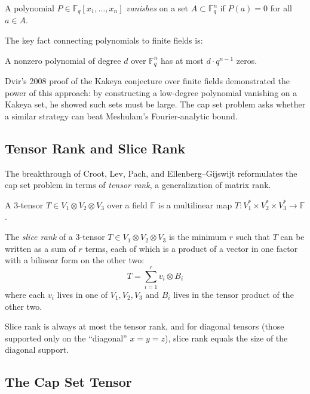 \begin{definition}
A polynomial $P \in \mathbb{F}_q[x_1, \ldots, x_n]$ \emph{vanishes} on a set $A \subset \mathbb{F}_q^n$ if $P(a) = 0$ for all $a \in A$.
\end{definition}

The key fact connecting polynomials to finite fields is:

\begin{fact}
A nonzero polynomial of degree $d$ over $\mathbb{F}_q^n$ has at most $d \cdot q^{n-1}$ zeros.
\end{fact}

Dvir's 2008 proof of the Kakeya conjecture over finite fields demonstrated the power of this approach: by constructing a low-degree polynomial vanishing on a Kakeya set, he showed such sets must be large. The cap set problem asks whether a similar strategy can beat Meshulam's Fourier-analytic bound.

\subsection{Tensor Rank and Slice Rank}

The breakthrough of Croot, Lev, Pach, and Ellenberg--Gijswijt reformulates the cap set problem in terms of \emph{tensor rank}, a generalization of matrix rank.

\begin{definition}[Tensor]
A 3-tensor $T \in V_1 \otimes V_2 \otimes V_3$ over a field $\mathbb{F}$ is a multilinear map $T: V_1^* \times V_2^* \times V_3^* \to \mathbb{F}$.
\end{definition}

\begin{definition}
The \emph{slice rank} of a 3-tensor $T \in V_1 \otimes V_2 \otimes V_3$ is the minimum $r$ such that $T$ can be written as a sum of $r$ terms, each of which is a product of a vector in one factor with a bilinear form on the other two:
\[
T = \sum_{i=1}^{r} v_i \otimes B_i
\]
where each $v_i$ lives in one of $V_1, V_2, V_3$ and $B_i$ lives in the tensor product of the other two.
\end{definition}

Slice rank is always at most the tensor rank, and for diagonal tensors (those supported only on the ``diagonal'' $x = y = z$), slice rank equals the size of the diagonal support.

\subsection{The Cap Set Tensor}

